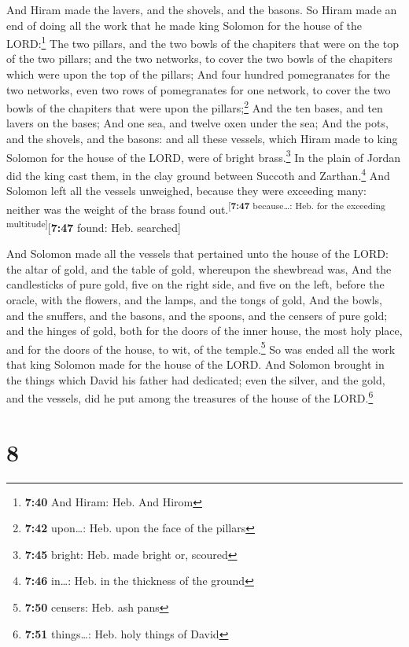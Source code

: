  And Hiram made the lavers, and the shovels, and the
basons. So Hiram made an end of doing all the work that he made king
Solomon for the house of the LORD:\footnote{\textbf{7:40} And Hiram:
  Heb. And Hirom}  The two pillars, and the two bowls of
the chapiters that were on the top of the two pillars; and the two
networks, to cover the two bowls of the chapiters which were upon the
top of the pillars;  And four hundred pomegranates for
the two networks, even two rows of pomegranates for one network, to
cover the two bowls of the chapiters that were upon the
pillars;\footnote{\textbf{7:42} upon\ldots: Heb. upon the face of the
  pillars}  And the ten bases, and ten lavers on the
bases;  And one sea, and twelve oxen under the sea;
 And the pots, and the shovels, and the basons: and all
these vessels, which Hiram made to king Solomon for the house of the
LORD, were of bright brass.\footnote{\textbf{7:45} bright: Heb. made
  bright or, scoured}  In the plain of Jordan did the
king cast them, in the clay ground between Succoth and
Zarthan.\footnote{\textbf{7:46} in\ldots: Heb. in the thickness of the
  ground}  And Solomon left all the vessels unweighed,
because they were exceeding many: neither was the weight of the brass
found out.\textsuperscript{{[}\textbf{7:47} because\ldots: Heb. for the
exceeding multitude{]}}{[}\textbf{7:47} found: Heb. searched{]}

 And Solomon made all the vessels that pertained unto the
house of the LORD: the altar of gold, and the table of gold, whereupon
the shewbread was,  And the candlesticks of pure gold,
five on the right side, and five on the left, before the oracle, with
the flowers, and the lamps, and the tongs of gold,  And
the bowls, and the snuffers, and the basons, and the spoons, and the
censers of pure gold; and the hinges of gold, both for the doors of the
inner house, the most holy place, and for the doors of the house, to
wit, of the temple.\footnote{\textbf{7:50} censers: Heb. ash pans}
 So was ended all the work that king Solomon made for the
house of the LORD. And Solomon brought in the things which David his
father had dedicated; even the silver, and the gold, and the vessels,
did he put among the treasures of the house of the LORD.\footnote{\textbf{7:51}
  things\ldots: Heb. holy things of David}

\hypertarget{section-7}{%
\section{8}\label{section-7}}

